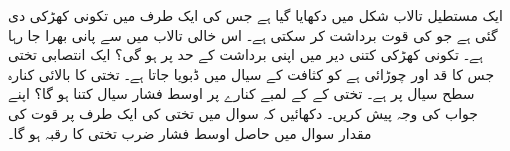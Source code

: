 ایک مستطیل تالاب شکل  میں دکھایا گیا ہے جس کی ایک طرف میں تکونی کھڑکی دی گئی ہے جو  کی قوت برداشت کر سکتی ہے۔ اس خالی تالاب میں  سے پانی بھرا جا رہا ہے۔ تکونی کھڑکی کتنی دیر میں اپنی برداشت کے حد پر ہو گی؟
ایک انتصابی تختی جس کا قد  اور چوڑائی  ہے کو کثافت  کے سیال میں ڈبویا جاتا ہے۔ تختی کا بالائی کنارہ سطح سیال پر ہے۔ تختی کے کے لمبے کنارے پر اوسط فشار سیال کتنا ہو گا؟ اپنے جواب کی وجہ پیش کریں۔ 
دکھائیں کہ سوال  میں تختی کی ایک طرف پر قوت کی مقدار سوال  میں حاصل اوسط فشار ضرب تختی کا رقبہ ہو گا۔

